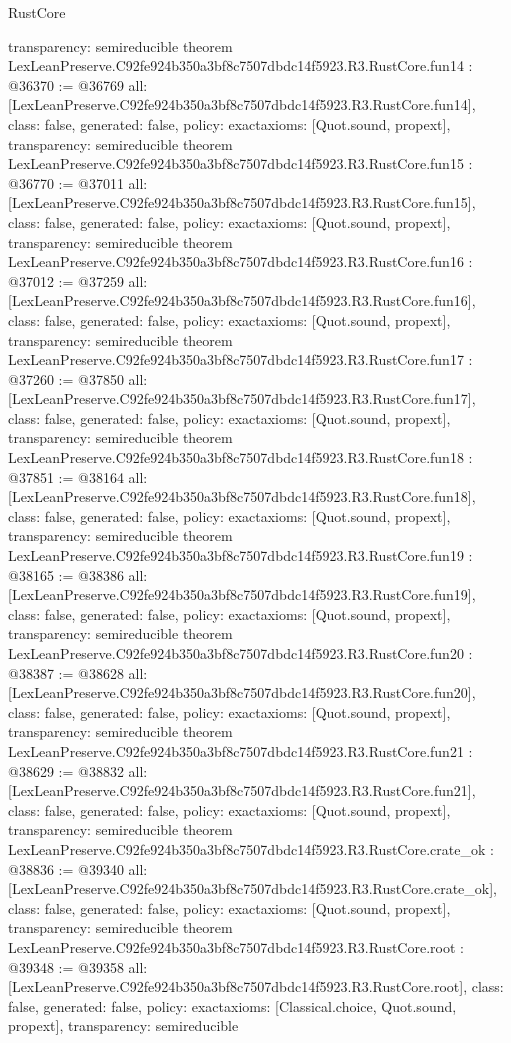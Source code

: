 \begin{lexlean}{RustCore}
\begin{coremodule}
{  transparency: semireducible
}
theorem LexLeanPreserve.C92fe924b350a3bf8c7507dbdc14f5923.R3.RustCore.fun14 : @36370 := @36769 {
  all: [LexLeanPreserve.C92fe924b350a3bf8c7507dbdc14f5923.R3.RustCore.fun14],
  class: false,
  generated: false,
  policy: exact{axioms: [Quot.sound, propext]},
  transparency: semireducible
}
theorem LexLeanPreserve.C92fe924b350a3bf8c7507dbdc14f5923.R3.RustCore.fun15 : @36770 := @37011 {
  all: [LexLeanPreserve.C92fe924b350a3bf8c7507dbdc14f5923.R3.RustCore.fun15],
  class: false,
  generated: false,
  policy: exact{axioms: [Quot.sound, propext]},
  transparency: semireducible
}
theorem LexLeanPreserve.C92fe924b350a3bf8c7507dbdc14f5923.R3.RustCore.fun16 : @37012 := @37259 {
  all: [LexLeanPreserve.C92fe924b350a3bf8c7507dbdc14f5923.R3.RustCore.fun16],
  class: false,
  generated: false,
  policy: exact{axioms: [Quot.sound, propext]},
  transparency: semireducible
}
theorem LexLeanPreserve.C92fe924b350a3bf8c7507dbdc14f5923.R3.RustCore.fun17 : @37260 := @37850 {
  all: [LexLeanPreserve.C92fe924b350a3bf8c7507dbdc14f5923.R3.RustCore.fun17],
  class: false,
  generated: false,
  policy: exact{axioms: [Quot.sound, propext]},
  transparency: semireducible
}
theorem LexLeanPreserve.C92fe924b350a3bf8c7507dbdc14f5923.R3.RustCore.fun18 : @37851 := @38164 {
  all: [LexLeanPreserve.C92fe924b350a3bf8c7507dbdc14f5923.R3.RustCore.fun18],
  class: false,
  generated: false,
  policy: exact{axioms: [Quot.sound, propext]},
  transparency: semireducible
}
theorem LexLeanPreserve.C92fe924b350a3bf8c7507dbdc14f5923.R3.RustCore.fun19 : @38165 := @38386 {
  all: [LexLeanPreserve.C92fe924b350a3bf8c7507dbdc14f5923.R3.RustCore.fun19],
  class: false,
  generated: false,
  policy: exact{axioms: [Quot.sound, propext]},
  transparency: semireducible
}
theorem LexLeanPreserve.C92fe924b350a3bf8c7507dbdc14f5923.R3.RustCore.fun20 : @38387 := @38628 {
  all: [LexLeanPreserve.C92fe924b350a3bf8c7507dbdc14f5923.R3.RustCore.fun20],
  class: false,
  generated: false,
  policy: exact{axioms: [Quot.sound, propext]},
  transparency: semireducible
}
theorem LexLeanPreserve.C92fe924b350a3bf8c7507dbdc14f5923.R3.RustCore.fun21 : @38629 := @38832 {
  all: [LexLeanPreserve.C92fe924b350a3bf8c7507dbdc14f5923.R3.RustCore.fun21],
  class: false,
  generated: false,
  policy: exact{axioms: [Quot.sound, propext]},
  transparency: semireducible
}
theorem LexLeanPreserve.C92fe924b350a3bf8c7507dbdc14f5923.R3.RustCore.crate_ok : @38836 := @39340 {
  all: [LexLeanPreserve.C92fe924b350a3bf8c7507dbdc14f5923.R3.RustCore.crate_ok],
  class: false,
  generated: false,
  policy: exact{axioms: [Quot.sound, propext]},
  transparency: semireducible
}
theorem LexLeanPreserve.C92fe924b350a3bf8c7507dbdc14f5923.R3.RustCore.root : @39348 := @39358 {
  all: [LexLeanPreserve.C92fe924b350a3bf8c7507dbdc14f5923.R3.RustCore.root],
  class: false,
  generated: false,
  policy: exact{axioms: [Classical.choice, Quot.sound, propext]},
  transparency: semireducible
}


\end{coremodule}
\end{lexlean}
